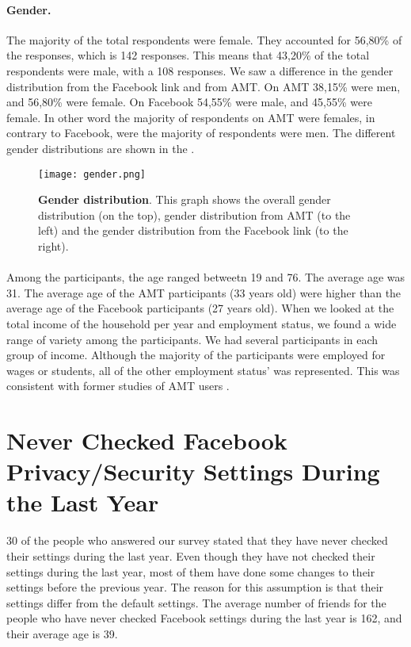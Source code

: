 \paragraph{Gender.}
The majority of the total respondents were female. They accounted for 56,80\% of the responses, which is 142 responses. This means that 43,20\% of the total respondents were male, with a 108 responses. We saw a difference in the gender distribution from the Facebook link and from AMT. On AMT 38,15\% were men, and 56,80\% were female. On Facebook 54,55\% were male, and 45,55\% were female. In other word the majority of respondents on AMT were females, in contrary to Facebook, were the majority of respondents were men. The different gender distributions are shown in the .

\begin{figure}[h!]
\centering
\texttt{[image: gender.png]}
\caption[Gender distribution]{\textbf{Gender distribution}. This graph shows the overall gender distribution (on the top), gender distribution from AMT (to the left) and the gender distribution from the Facebook link (to the right).} 
\label{fig:gender}
\end{figure}
 
\paragraph{}
Among the participants, the age ranged betweetn 19 and 76. The average age was 31. The average age of the AMT participants (33 years old) were higher than the average age of the Facebook participants (27 years old). When we looked at the total income of the household per year and employment status, we found a wide range of variety among the participants. We had several participants in each group of income. Although the majority of the participants were employed for wages or students, all of the other employment status' was represented. This was consistent with former studies of AMT users \cite{incentivesAmt}. 


\section{Never Checked Facebook Privacy/Security Settings During the Last Year}

30 of the people who answered our survey stated that they have never checked their settings during the last year. Even though they have not checked their  settings during the last year, most of them have done some changes to their settings before the previous year. The reason for this assumption is that their settings differ from the default settings.  
The average number of friends for the people who have never checked Facebook  settings during the last year is 162, and their average age is 39. 

